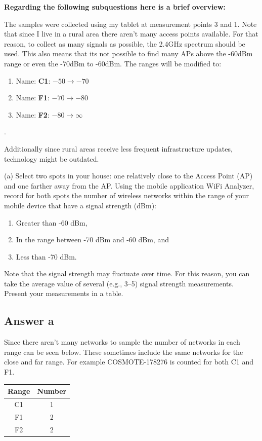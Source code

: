 \documentclass{article}
\begin{document}
\textbf{Regarding the following subquestions here is a brief overview:} 

The samples were collected using my tablet at measurement points 3 and 1. Note that since I live in a rural area there aren't many access points available. For that reason, to collect as many signals as possible, the 2.4GHz spectrum should be used. This also means that its not possible to find many APs above the -60dBm range or even the -70dBm to -60dBm. The ranges will be modified to: 

\begin{enumerate}
    \item Name: \textbf{C1}: $-50 \rightarrow -70$
    \item Name: \textbf{F1}: $-70 \rightarrow -80$ 
    \item Name: \textbf{F2}: $-80 \rightarrow \infty$
\end{enumerate}. 

Additionally since rural areas receive less frequent infrastructure updates, technology might be outdated. 

(a) Select two spots in your house: one relatively close to the Access Point (AP) and one farther away from the AP.
Using the mobile application WiFi Analyzer, record for both spots the number of wireless networks within the range of your mobile device that have a signal strength (dBm):

\begin{enumerate}
    \item Greater than -60 dBm,
    \item In the range between -70 dBm and -60 dBm, and
    \item Less than -70 dBm.
\end{enumerate}

Note that the signal strength may fluctuate over time.
For this reason, you can take the average value of several (e.g., 3–5) signal strength measurements.
Present your measurements in a table.


\subsection{Answer a}

Since there aren't many networks to sample the number of networks in each range can be seen below. These sometimes include the same networks for the close and far range. For example COSMOTE-178276 is counted for both C1 and F1.


\begin{center}
\begin{tabular}{| c | c |}
    \hline
     Range & Number  \\
     \hline
     C1 & 1 \\
     \hline
     F1 & 2 \\
     \hline
     F2 & 2\\
     \hline
\end{tabular} 
\end{center}
\end{document}
